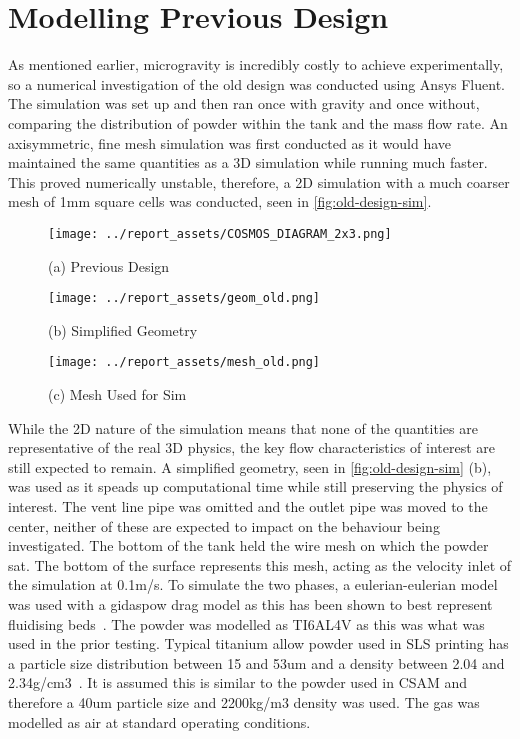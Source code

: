 \section{Modelling Previous Design}\label{sec:old-design-method}
As mentioned earlier, microgravity is incredibly costly to achieve experimentally, so a numerical investigation of the old design was conducted using Ansys Fluent. The simulation was set up and then ran once with gravity and once without, comparing the distribution of powder within the tank and the mass flow rate. An axisymmetric, fine mesh simulation was first conducted as it would have maintained the same quantities as a 3D simulation while running much faster. This proved numerically unstable, therefore, a 2D simulation with a much coarser mesh of 1mm square cells was conducted, seen in \autoref{fig:old-design-sim}.
\begin{figure}[htbp]
    \centering

    \begin{minipage}{0.3\textwidth}
        \centering
        \texttt{[image: ../report\_assets/COSMOS\_DIAGRAM\_2x3.png]}
        \caption*{(a) Previous Design}
    \end{minipage}
    \hfill
    \begin{minipage}{0.3\textwidth}
        \centering
        \texttt{[image: ../report\_assets/geom\_old.png]}
        \caption*{(b) Simplified Geometry}\label{fig:idkyet9}
    \end{minipage}
    \hfill
    \begin{minipage}{0.3\textwidth}
        \centering
        \texttt{[image: ../report\_assets/mesh\_old.png]}
        \caption*{(c) Mesh Used for Sim}\label{fig:idkyet10}
    \end{minipage}
    
\end{figure}\label{fig:old-design-sim}
While the 2D nature of the simulation means that none of the quantities are representative of the real 3D physics, the key flow characteristics of interest are still expected to remain. 
A simplified geometry, seen in \autoref{fig:old-design-sim} (b), was used as it speads up computational time while still preserving the physics of interest. The vent line pipe was omitted and the outlet pipe was moved to the center, neither of these are expected to impact on the behaviour being investigated. The bottom of the tank held the wire mesh on which the powder sat. The bottom of the surface represents this mesh, acting as the velocity inlet of the simulation at 0.1m/s. To simulate the two phases, a eulerian-eulerian model was used with a gidaspow drag model as this has been shown to best represent fluidising beds~\cite{C6RA28615A}. The powder was modelled as TI6AL4V as this was what was used in the prior testing. Typical titanium allow powder used in SLS printing has a particle size distribution between 15 and 53um and a density between 2.04 and 2.34g/cm3~\cite{ma17040952}. It is assumed this is similar to the powder used in CSAM and therefore a 40um particle size and 2200kg/m3 density was used. The gas was modelled as air at standard operating conditions.

